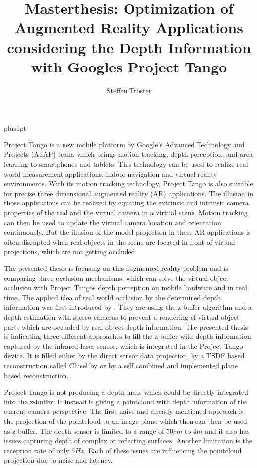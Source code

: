 \documentclass[12pt]{support/thcolognereport}
\title{Masterthesis: Optimization of Augmented Reality Applications considering the Depth Information with Googles Project Tango}
\author{Steffen Tröster}
\begin{document}
\baselineskip=18pt plus1pt

\maketitle 

\setlength{\parskip}{1em}

Project Tango is a new mobile platform by Google’s Advanced Technology and Projects (ATAP) team, which brings motion tracking, depth perception, and area learning to smartphones and tablets. This technology can be used to realize real world measurement applications, indoor navigation and virtual reality environments.  With its motion tracking technology, Project Tango is also suitable for precise three dimensional augmented reality (AR) applications. The illusion in those applications can be realized by equating the extrinsic and intrinsic camera properties of the real and the virtual camera in a virtual scene. Motion tracking can then be used to update the virtual camera location and orientation continuously. But the illusion of the model projection in these AR applications is often disrupted when real objects in the scene are located in front of virtual projections, which are not getting occluded.

The presented thesis is focusing on this augmented reality problem and is comparing three occlusion mechanisms, which can solve the virtual object occlusion with Project Tangos depth perception on mobile hardware and in real time. The applied idea of real world occlusion by the determined depth information was first introduced by \citet{wloka1995resolving}. They are using the z-buffer algorithm and a depth estimation with stereo cameras to prevent a rendering of virtual object parts which are occluded by real object depth information. The presented thesis is indicating three different approaches to fill the z-buffer with depth information captured by the infrared laser sensor, which is integrated in the Project Tango device. It is filled either by the direct sensor data projection, by a TSDF based reconstruction called Chisel by \citet{Klingensmith_2015_7924} or by a self combined and implemented plane based reconstruction. 

Project Tango is not producing a depth map, which could be directly integrated into the z-buffer. It instead is giving a pointcloud with depth information of the current camera perspective. The first naive and already mentioned approach is the projection of the pointcloud to an image plane which then can then be used as z-buffer. The depth sensor is limited to a range of \(50cm\) to \(4m\) and it also has issues capturing depth of complex or reflecting surfaces. Another limitation is the reception rate of only \(5Hz\). Each of these issues are influencing the pointcloud projection due to noise and latency.
\end{document}
